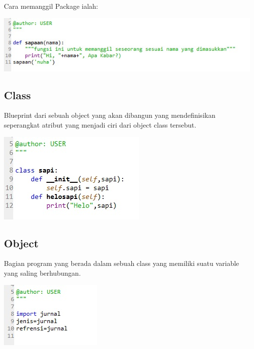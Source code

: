 \documentclass[a4paper,12pt]{report}
\begin{document}
Cara memanggil Package ialah:
\begin{center}
    \includegraphics[width=11cm\textwidth]{Figure/package.jpg}
    \end{center}
    
\subsection{Class}
\par Blueprint dari sebuah object yang akan dibangun yang mendefinisikan seperangkat atribut yang menjadi ciri dari object class tersebut.
    \begin{center}
    \includegraphics[width=11cm\textwidth]{Figure/class.jpg}
    \end{center}
    
\subsection{Object}
\par Bagian program yang berada dalam sebuah class yang memiliki suatu variable yang saling berhubungan.
    \begin{center}
    \includegraphics[width=11cm\textwidth]{Figure/obcjact.jpg}
    \end{center}
    
\end{document}
